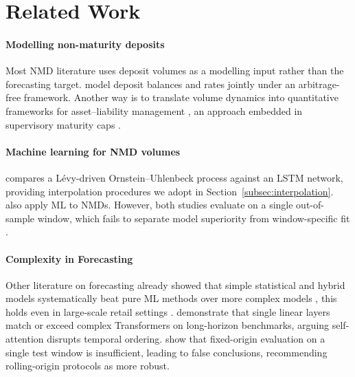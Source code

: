 \documentclass[11pt,a4paper]{article}
\begin{document}
\section{Related Work}
\label{sec:related_work}

\paragraph{Modelling non-maturity deposits}
Most NMD literature uses deposit volumes as a modelling input rather than the forecasting target. \citet{jarrow1998} model deposit balances and rates jointly under an
arbitrage-free framework. Another way is to translate volume dynamics into
quantitative frameworks for asset--liability management
\citep{frauendorfer2003, kalkbrener2004, blochlinger2015, nystrom2008}, an
approach embedded in supervisory maturity caps \citep{bcbs2016irrbb,
eba2022irrbb}.

\paragraph{Machine learning for NMD volumes}
\citet{winkler2025} compares a L\'evy-driven
Ornstein--Uhlenbeck process against an LSTM network, providing interpolation
procedures we adopt in Section~\ref{subsec:interpolation}.
\citet{marena2022nonmaturing} also apply ML to NMDs. However, both studies
evaluate on a single out-of-sample window, which fails to separate
model superiority from window-specific fit \citep{hewamalage2023}.


\paragraph{Complexity in Forecasting}
Other literature on forecasting already showed that simple statistical and hybrid models systematically beat pure ML methods over more complex models \citep{makridakis2020m4}, this holds even in large-scale retail settings \citep{makridakis2022m5}.
\citet{zeng2023transformers} demonstrate that single linear layers match or
exceed complex Transformers on long-horizon benchmarks, arguing self-attention
disrupts temporal ordering. \citet{hewamalage2023} show that fixed-origin evaluation on a single 
test window is insufficient, leading to false conclusions, 
recommending rolling-origin protocols as more robust.
\end{document}
